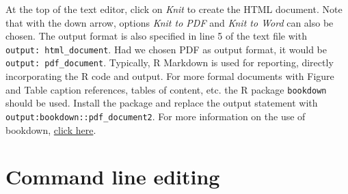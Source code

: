 \documentclass[
]{book}
\newenvironment{Shaded}{\begin{snugshade}}{\end{snugshade}}
\newcommand{\NormalTok}[1]{#1}
\begin{document}
\begin{Shaded}
\end{Shaded}

At the top of the text editor, click on \emph{Knit} to create the HTML document. Note that with the down arrow, options \emph{Knit to PDF} and \emph{Knit to Word} can also be chosen. The output format is also specified in line 5 of the text file with \texttt{output:\ html\_document}. Had we chosen PDF as output format, it would be \texttt{output:\ pdf\_document}. Typically, R Markdown is used for reporting, directly incorporating the R code and output. For more formal documents with Figure and Table caption references, tables of content, etc. the R package \texttt{bookdown} should be used. Install the package and replace the output statement with \texttt{output:bookdown::pdf\_document2}. For more information on the use of bookdown, \href{https://bookdown.org/}{click here}.

\section{Command line editing}\label{command-line-editing}
\end{document}
